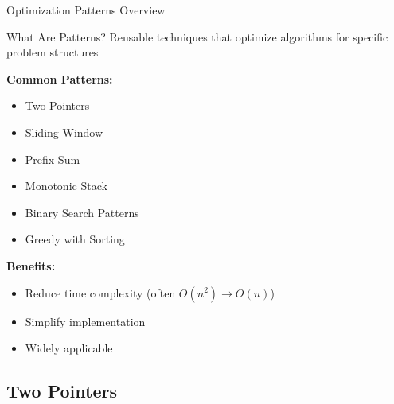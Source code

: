 \documentclass[aspectratio=169,xcolor=dvipsnames]{beamer}
\begin{document}
\begin{frame}{Optimization Patterns Overview}
  \begin{block}{What Are Patterns?}
    Reusable techniques that optimize algorithms for specific problem structures
  \end{block}

  \vspace{0.3cm}
  \textbf{Common Patterns:}
  \begin{itemize}
    \item Two Pointers
    \item Sliding Window
    \item Prefix Sum
    \item Monotonic Stack
    \item Binary Search Patterns
    \item Greedy with Sorting
  \end{itemize}

  \vspace{0.3cm}
  \textbf{Benefits:}
  \begin{itemize}
    \item Reduce time complexity (often $O(n^2) \to O(n)$)
    \item Simplify implementation
    \item Widely applicable
  \end{itemize}
\end{frame}

\subsection{Two Pointers}
\end{document}
